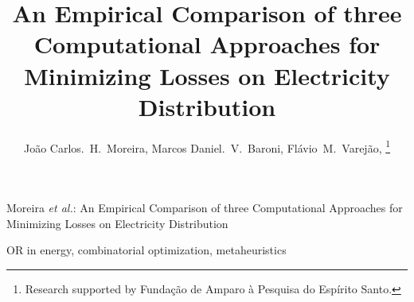 \documentclass[peerreview]{IEEEtran}
\begin{document}
\title{An Empirical Comparison of three Computational Approaches for Minimizing Losses on Electricity Distribution}

\author{Jo\~ao Carlos.~H.~Moreira,
	Marcos Daniel.~V.~Baroni,
	Fl\'avio~M.~Varej\~ao,
\thanks{Research supported by Funda\c c\~ao de Amparo \`a Pesquisa do Esp\'irito Santo.}}

%
{Moreira \MakeLowercase{\textit{et al.}}: An Empirical Comparison of three Computational Approaches for Minimizing Losses on Electricity Distribution}

\maketitle

\begin{abstract}

\end{abstract}

\begin{IEEEkeywords}
OR in energy, combinatorial optimization, metaheuristics
\end{IEEEkeywords}

\IEEEpeerreviewmaketitle









\ifCLASSOPTIONcaptionsoff
  \newpage
\fi




\end{document}
